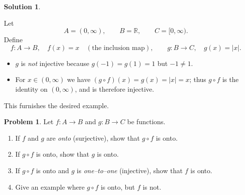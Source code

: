 \documentclass[12pt]{article}
\theoremstyle{definition} %
\newtheorem{solution}{Solution}
\newtheorem{problem}{Problem}
\theoremstyle{plain} %
\begin{document}
\begin{solution}
\begin{enumerate}[label=(\alph*)]
      Let
      \[
          A=(0,\infty),\qquad
          B=\mathbb{R},\qquad
          C=[0,\infty).
      \]
      Define
      \[
          f:A\longrightarrow B,\quad f(x)=x
          \quad(\text{the inclusion map}),
          \qquad
          g:B\longrightarrow C,\quad g(x)=|x|.
      \]
      \begin{itemize}
          \item \(g\) is \emph{not} injective because \(g(-1)=g(1)=1\) but \(-1\ne 1\).
          \item For \(x\in(0,\infty)\) we have \((g\circ f)(x)=g(x)=|x|=x\);
                thus \(g\circ f\) is the identity on \((0,\infty)\), and is therefore
                injective.
      \end{itemize}
      This furnishes the desired example.
  \end{enumerate}
  \end{solution}
  \begin{problem}
    Let \(f:A\to B\) and \(g:B\to C\) be functions.
    
    \begin{enumerate}[label=(\alph*)]
        \item If \(f\) and \(g\) are \emph{onto} (surjective), show that \(g\circ f\) is onto.
        \item If \(g\circ f\) is onto, show that \(g\) is onto.
        \item If \(g\circ f\) is onto and \(g\) is \emph{one–to–one} (injective), show that \(f\) is onto.
        \item Give an example where \(g\circ f\) is onto, but \(f\) is not.
    \end{enumerate}
    \end{problem}
    
\end{document}
